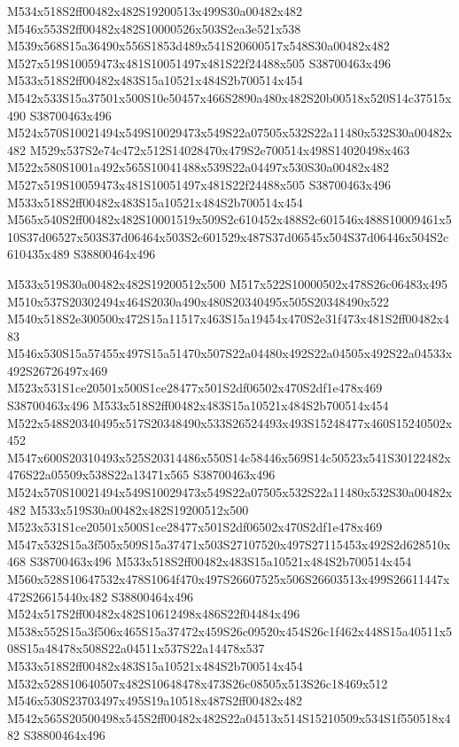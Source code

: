 \documentclass{article}
\begin{document}
\begin{multicols}{2}
M534x518S2ff00482x482S19200513x499S30a00482x482 M546x553S2ff00482x482S10000526x503S2ea3e521x538 M539x568S15a36490x556S1853d489x541S20600517x548S30a00482x482 M527x519S10059473x481S10051497x481S22f24488x505 S38700463x496 M533x518S2ff00482x483S15a10521x484S2b700514x454 M542x533S15a37501x500S10e50457x466S2890a480x482S20b00518x520S14c37515x490 S38700463x496 M524x570S10021494x549S10029473x549S22a07505x532S22a11480x532S30a00482x482 M529x537S2e74c472x512S14028470x479S2e700514x498S14020498x463 M522x580S1001a492x565S10041488x539S22a04497x530S30a00482x482 M527x519S10059473x481S10051497x481S22f24488x505 S38700463x496 M533x518S2ff00482x483S15a10521x484S2b700514x454 M565x540S2ff00482x482S10001519x509S2c610452x488S2c601546x488S10009461x510S37d06527x503S37d06464x503S2c601529x487S37d06545x504S37d06446x504S2c610435x489 S38800464x496

M533x519S30a00482x482S19200512x500 M517x522S10000502x478S26c06483x495 M510x537S20302494x464S2030a490x480S20340495x505S20348490x522 M540x518S2e300500x472S15a11517x463S15a19454x470S2e31f473x481S2ff00482x483 M546x530S15a57455x497S15a51470x507S22a04480x492S22a04505x492S22a04533x492S26726497x469 M523x531S1ce20501x500S1ce28477x501S2df06502x470S2df1e478x469 S38700463x496 M533x518S2ff00482x483S15a10521x484S2b700514x454 M522x548S20340495x517S20348490x533S26524493x493S15248477x460S15240502x452 M547x600S20310493x525S20314486x550S14c58446x569S14c50523x541S30122482x476S22a05509x538S22a13471x565 S38700463x496 M524x570S10021494x549S10029473x549S22a07505x532S22a11480x532S30a00482x482 M533x519S30a00482x482S19200512x500 M523x531S1ce20501x500S1ce28477x501S2df06502x470S2df1e478x469 M547x532S15a3f505x509S15a37471x503S27107520x497S27115453x492S2d628510x468 S38700463x496 M533x518S2ff00482x483S15a10521x484S2b700514x454 M560x528S10647532x478S1064f470x497S26607525x506S26603513x499S26611447x472S26615440x482 S38800464x496 M524x517S2ff00482x482S10612498x486S22f04484x496 M538x552S15a3f506x465S15a37472x459S26c09520x454S26c1f462x448S15a40511x508S15a48478x508S22a04511x537S22a14478x537 M533x518S2ff00482x483S15a10521x484S2b700514x454 M532x528S10640507x482S10648478x473S26c08505x513S26c18469x512 M546x530S23703497x495S19a10518x487S2ff00482x482 M542x565S20500498x545S2ff00482x482S22a04513x514S15210509x534S1f550518x482 S38800464x496



\end{multicols}
\end{document}
